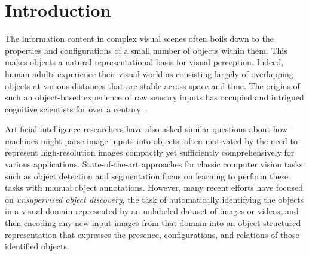 \documentclass{article}
\newcommand{\jd}[1]{\textcolor{orange}{[DJ: #1]}}
\begin{document}
\section{Introduction}
\label{sec:intro}





The information content in complex visual scenes often boils down to the properties and configurations of a small number of objects within them. This makes objects a natural representational basis for visual perception. Indeed, human adults experience their visual world as consisting largely of overlapping objects at various distances that are stable across space and time. The origins of such an object-based experience of raw sensory inputs has occupied and intrigued cognitive scientists for over a century~\cite{wertheimer1912experimentelle, wertheimer1938laws, spelke1990principles, spelke1992origins, johnson2010infants, spelke2007core}.%

Artificial intelligence researchers have also asked similar questions about how machines might parse image inputs into objects, often motivated by the need to represent high-resolution images compactly yet sufficiently comprehensively for various applications. State-of-the-art approaches for classic computer vision tasks such as object detection and segmentation focus on learning to perform these tasks with manual object annotations. However, many recent efforts have focused on \emph{unsupervised object discovery}, the task of automatically identifying the objects in a visual domain represented by an unlabeled dataset of images or videos, and then encoding any new input images from that domain into an object-structured representation that expresses the presence, configurations, and relations of those identified objects. 

\end{document}

